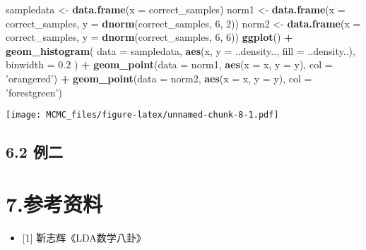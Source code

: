 \documentclass[]{article}
\newenvironment{Shaded}{\begin{snugshade}}{\end{snugshade}}
\newcommand{\KeywordTok}[1]{\textcolor[rgb]{0.13,0.29,0.53}{\textbf{#1}}}
\newcommand{\DataTypeTok}[1]{\textcolor[rgb]{0.13,0.29,0.53}{#1}}
\newcommand{\DecValTok}[1]{\textcolor[rgb]{0.00,0.00,0.81}{#1}}
\newcommand{\FloatTok}[1]{\textcolor[rgb]{0.00,0.00,0.81}{#1}}
\newcommand{\StringTok}[1]{\textcolor[rgb]{0.31,0.60,0.02}{#1}}
\newcommand{\OperatorTok}[1]{\textcolor[rgb]{0.81,0.36,0.00}{\textbf{#1}}}
\newcommand{\NormalTok}[1]{#1}
\providecommand{\tightlist}{%
  \setlength{\itemsep}{0pt}\setlength{\parskip}{0pt}}
\begin{document}
\begin{Shaded}
\begin{Highlighting}[]
\NormalTok{sampledata <-}\StringTok{ }\KeywordTok{data.frame}\NormalTok{(}\DataTypeTok{x =}\NormalTok{ correct_samples)}
\NormalTok{norm1 <-}\StringTok{ }\KeywordTok{data.frame}\NormalTok{(}\DataTypeTok{x =}\NormalTok{ correct_samples, }\DataTypeTok{y =} \KeywordTok{dnorm}\NormalTok{(correct_samples, }\DecValTok{6}\NormalTok{, }\DecValTok{2}\NormalTok{))}
\NormalTok{norm2 <-}\StringTok{ }\KeywordTok{data.frame}\NormalTok{(}\DataTypeTok{x =}\NormalTok{ correct_samples, }\DataTypeTok{y =} \KeywordTok{dnorm}\NormalTok{(correct_samples, }\DecValTok{6}\NormalTok{, }\DecValTok{6}\NormalTok{))}
\KeywordTok{ggplot}\NormalTok{() }\OperatorTok{+}
\StringTok{  }\KeywordTok{geom_histogram}\NormalTok{(}
    \DataTypeTok{data =}\NormalTok{ sampledata, }
    \KeywordTok{aes}\NormalTok{(x, }\DataTypeTok{y =}\NormalTok{ ..density.., }\DataTypeTok{fill =}\NormalTok{ ..density..), }\DataTypeTok{binwidth =} \FloatTok{0.2}
\NormalTok{    ) }\OperatorTok{+}
\StringTok{  }\KeywordTok{geom_point}\NormalTok{(}\DataTypeTok{data =}\NormalTok{ norm1, }\KeywordTok{aes}\NormalTok{(}\DataTypeTok{x =}\NormalTok{ x, }\DataTypeTok{y =}\NormalTok{ y), }\DataTypeTok{col =} \StringTok{'orangered'}\NormalTok{) }\OperatorTok{+}
\StringTok{  }\KeywordTok{geom_point}\NormalTok{(}\DataTypeTok{data =}\NormalTok{ norm2, }\KeywordTok{aes}\NormalTok{(}\DataTypeTok{x =}\NormalTok{ x, }\DataTypeTok{y =}\NormalTok{ y), }\DataTypeTok{col =} \StringTok{'forestgreen'}\NormalTok{)}
\end{Highlighting}
\end{Shaded}

\texttt{[image: MCMC\_files/figure-latex/unnamed-chunk-8-1.pdf]}

\subsection{6.2 例二}

\section{7.参考资料}

\begin{itemize}
\tightlist
\item
  {[}1{]} 靳志辉《LDA数学八卦》
\end{itemize}
\end{document}
